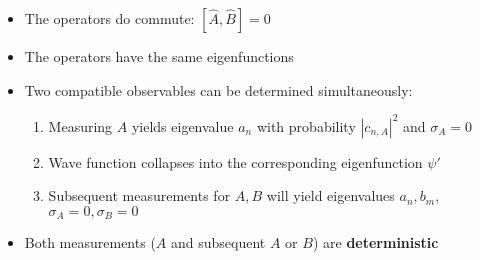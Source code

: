 \begin{itemize}
    \item The operators do commute: $[\widehat{A}, \widehat{B}] = 0$
    \item The operators have the same eigenfunctions
    \item Two compatible observables can be determined simultaneously:
    \begin{enumerate}
        \item Measuring $A$ yields eigenvalue $a_n$ with probability $|c_{n,A}|^2$ and $\sigma_A=0$
        \item Wave function collapses into the corresponding eigenfunction $\psi'$
        \item Subsequent measurements for $A,B$ will yield eigenvalues $a_n, b_m$, $\sigma_A=0, \sigma_B=0$
    \end{enumerate}
    \item Both measurements ($A$ and subsequent $A$ or $B$) are \textbf{deterministic}
\end{itemize}



